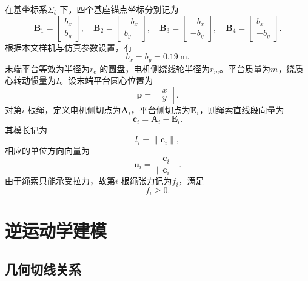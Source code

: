 在基坐标系$\Sigma_b$ 下，四个基座锚点坐标分别记为
\begin{equation}
  \bm B_1=\begin{bmatrix}
    b_x \\ b_y
  \end{bmatrix},\quad
  \bm B_2=\begin{bmatrix}
    -b_x \\ b_y
  \end{bmatrix},\quad
  \bm B_3=\begin{bmatrix}
    -b_x \\ -b_y
  \end{bmatrix},\quad
  \bm B_4=\begin{bmatrix}
    b_x \\ -b_y
  \end{bmatrix}.
  \label{eq:ch3-base-anchor}
\end{equation}
根据本文样机与仿真参数设置，有
\begin{equation}
  b_x=b_y=0.19\ \mathrm{m}.
\end{equation}
末端平台等效为半径为$r_e$ 的圆盘，电机侧绕线轮半径为$r_m$。平台质量为$m$，绕质心转动惯量为$I$。设末端平台圆心位置为
\begin{equation}
  \bm p=\begin{bmatrix}
    x \\ y
  \end{bmatrix}.
\end{equation}
对第$i$ 根绳，定义电机侧切点为$\bm A_i$，平台侧切点为$\bm E_i$，则绳索直线段向量为
\begin{equation}
  \bm c_i=\bm A_i-\bm E_i. \label{eq:ch3-ci}
\end{equation}
其模长记为
\begin{equation}
  l_i=\|\bm c_i\|,
\end{equation}
相应的单位方向向量为
\begin{equation}
  \bm u_i=\frac{\bm c_i}{\|\bm c_i\|}. \label{eq:ch3-ui}
\end{equation}
由于绳索只能承受拉力，故第$i$ 根绳张力记为$f_i$，满足
\begin{equation}
  f_i\ge 0.
\end{equation}


\section{逆运动学建模}

\subsection{几何切线关系}

